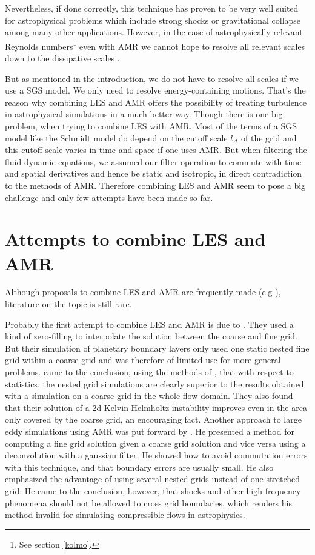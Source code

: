 Nevertheless, if done correctly, this technique has proven to be very well
suited for astrophysical problems which include strong
shocks or gravitational collapse \citep{Bryan2001} among many other
applications. However, in the case of astrophysically relevant Reynolds
numbers\footnote{See section \ref{kolmo}.} even with AMR we cannot hope to
resolve all relevant scales down to the dissipative scales
\citep{Schmidt2006a}.

But as mentioned in the introduction, we do not have to
resolve all scales if we use a SGS model. We only need to resolve
energy-containing motions. That's the reason why combining LES and AMR offers
the
possibility of treating turbulence in astrophysical simulations in a much better
way. Though there is one big problem, when trying to combine LES with AMR. Most
of the terms of a SGS model like the Schmidt model do depend on the
cutoff scale $l_{\Delta}$ of the grid and this cutoff scale varies in time and
space if one uses AMR. But when filtering the fluid dynamic equations, we
assumed our filter operation to commute with time and spatial derivatives and
hence be static and isotropic, in direct contradiction to the methods of AMR.
Therefore combining LES and AMR seem to pose a big challenge and only few
attempts have been made so far.

\section{Attempts to combine LES and AMR}
Although proposals to combine LES and AMR are frequently made
(e.g \citet{Pope2004}), literature on the topic is still rare.

Probably the first attempt to combine LES and AMR is due to
\citet{Sullivan1996}. They used a kind of zero-filling to interpolate
the solution between the coarse and fine grid. But their simulation of
planetary boundary layers only used one static nested fine grid within a coarse
grid and was therefore of limited use for more general problems.
\citet{Boersma1997} came to the conclusion, using the methods of
\citet{Sullivan1996}, that with respect to statistics, the nested grid
simulations are clearly superior to the results obtained with a simulation on a
coarse grid in the whole flow domain. They also found that their
solution of a 2d Kelvin-Helmholtz instability improves even in the area only
covered by the coarse grid, an encouraging fact. Another approach to large eddy
simulations using AMR was put forward by \citet{Cook1999}. He presented a
method for computing a fine grid solution given a coarse grid solution and vice
versa using a deconvolution with a gaussian filter. He showed how to avoid
commutation errors with this technique, and that boundary errors are usually
small. He also emphasized the advantage of using several nested grids instead
of one stretched grid. He came to the conclusion, however, that shocks and
other 
high-frequency phenomena should not be allowed to cross grid boundaries, which
renders his method invalid for simulating compressible flows in astrophysics. 

